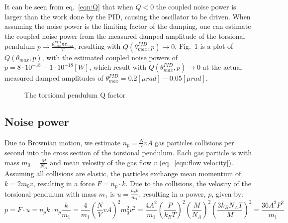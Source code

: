 \documentclass[\main/master.tex]{subfiles}
\begin{document}
It can be seen from eq.~\ref{eqn:Q} that when $Q<0$ the coupled noise power is larger than the work done by the PID, causing the oscillator to be driven. When assuming the noise power is the limiting factor of the damping, one can estimate the coupled noise power from the measured damped amplitude of the torsional pendulum $p \rightarrow \frac{ \theta_{max}^{PID}\pi\tau_{max}}{T}$, resulting with $Q(\theta_{max}^{PID},p)	\rightarrow 0$. Fig.~\ref{fig:Q factor} is a plot of $Q(\theta_{max},p)$, with the estimated coupled noise powers  of $p= 8\cdot 10^{-18} - 1\cdot 10^{-18} [W]$, which result  with $Q(\theta_{max}^{PID},p) \rightarrow 0$ at the actual measured damped amplitudes of $\theta_{max}^{PID}= 0.2 [\mu rad] -0.05 [\mu rad]$.

\begin{figure}[htbp]
	\centering
	\caption[The torsional pendulum Q factor]{The torsional pendulum Q factor}
	\label{fig:Q factor}
\end{figure} 

\subsection{Noise power}
Due to Brownian motion, we estimate $n_p= \frac{N}{V}v A$ gas particles collisions per second into the cross section of the torsional pendulum. Each gas particle is with mass $m_0 = \frac{M}{N_A}$ and mean velosity of the gas flow $v$ (eq.~\ref{eqn:flow velocity}). Assuming all collisions are elastic, the particles exchange mean momentum of $k=2m_0v$, resulting in a force $F = n_p\cdot k$. Due to the collisions, the velosity of the torsional pendulum with mass $m_1$ is $ u =\frac{ n_p k}{m_1}$, resulting in a power, $p$, given by:
\begin{equation}
p = F\cdot u =  n_p k \cdot n_p\frac{k}{m_1} =\frac{4}{m_1}(\frac{N}{V}v A)^2m_0^2v^2=\frac{4A^2}{m_1}(\frac{P}{k_B T})^2(\frac{M}{N_A})^2 (\frac{3 k_B N_A T}{M})^2 =\frac{36A^2P^2}{m_1} 
\label{eqn:Brownian power}
\end{equation}
\end{document}

